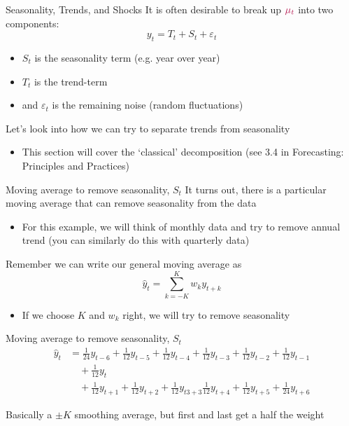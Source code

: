 \documentclass[aspectratio=169,t,11pt,table]{beamer}
\begin{document}
\begin{frame}{Seasonality, Trends, and Shocks}
  It is often desirable to break up ${\color[HTML]{B3114B} \mu_t}$ into two components:
  $$
    y_t = T_t + S_t +  \varepsilon_t
  $$
  \begin{itemize}
    \item $S_t$ is the seasonality term (e.g. year over year)
    
    \item $T_t$ is the trend-term
    
    \item and $\varepsilon_t$ is the remaining noise (random fluctuations)
  \end{itemize}

  \bigskip
  Let's look into how we can try to separate trends from seasonality
  \begin{itemize}
    \item This section will cover the `classical' decomposition (see 3.4 in Forecasting: Principles and Practices)
  \end{itemize}
\end{frame}


\begin{frame}{Moving average to remove seasonality, $S_t$}
  It turns out, there is a particular moving average that can remove seasonality from the data
  \begin{itemize}
    \item For this example, we will think of monthly data and try to remove annual trend (you can similarly do this with quarterly data)
  \end{itemize}

  \bigskip
  Remember we can write our general moving average as
  $$
    \hat{y}_t = \sum_{k=-K}^K w_k y_{t + k}
  $$
  \begin{itemize}
    \item If we choose $K$ and $w_k$ right, we will try to remove seasonality
  \end{itemize}
\end{frame}

\begin{frame}{Moving average to remove seasonality, $S_t$}
  \begin{align*}
    \hat{y}_t &= \frac{1}{24} y_{t-6} + \frac{1}{12} y_{t-5} + \frac{1}{12} y_{t-4} + \frac{1}{12} y_{t-3} + \frac{1}{12} y_{t-2} + \frac{1}{12} y_{t-1} \\
    &\quad + \frac{1}{12} y_{t} \\
    &\quad + \frac{1}{12} y_{t+1} + \frac{1}{12} y_{t+2} + \frac{1}{12} y_{t3+3} \frac{1}{12} y_{t+4} + \frac{1}{12} y_{t+5} + \frac{1}{24} y_{t+6} 
  \end{align*}

  Basically a $\pm K$ smoothing average, but first and last get a half the weight
\end{frame}
\end{document}
